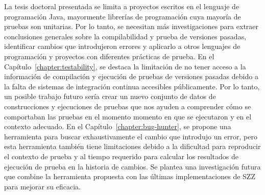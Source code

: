 La tesis doctoral presentada se limita a proyectos escritos en el lenguaje de programación Java, mayormente librerías de programación cuya mayoría de pruebas son unitarias. Por lo tanto, se necesitan más investigaciones para extraer conclusiones generales sobre la compilabilidad y prueba de versiones pasadas, identificar cambios que introdujeron errores y aplicarlo a otros lenguajes de programación y proyectos con diferentes prácticas de prueba. En el Capítulo~\ref{chapter:testability}, se destaca la limitación de no tener acceso a la información de compilación y ejecución de pruebas de versiones pasadas debido a la falta de sistemas de integración continua accesibles públicamente. 
Por lo tanto, un posible trabajo futuro sería crear un nuevo conjunto de datos de construcciones y ejecuciones de pruebas que nos ayuden a comprender cómo se comportaban las pruebas en el momento momento en que se ejecutaron y en el contexto adecuado.
En el Capítulo~\ref{chapter:bug-hunter}, se propone una herramienta para buscar exhaustivamente el cambio que introdujo un error, pero esta herramienta también tiene limitaciones debido a la dificultad para reproducir el contexto de prueba y al tiempo requerido para calcular los resultados de ejecución de prueba en la historia de cambios. Se plantea una investigación futura que combine la herramienta propuesta con las últimas implementaciones de SZZ para mejorar su eficacia.